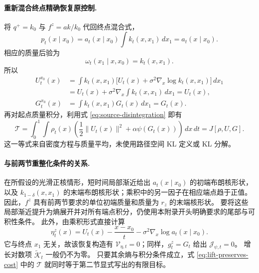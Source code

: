 \documentclass[UTF8,a4paper,11pt,fontset=fandol]{ctexart}
\begin{document}
\paragraph{重新混合终点精确恢复原控制.}
将 $q^+=k_0$ 与 $f^z=ak/k_0$ 代回终点混合式，
\begin{equation}
p_t(x\mid x_0)
=a_t(x\mid x_0)\int k_t(x,x_1)\,dx_1
=a_t(x\mid x_0).
\end{equation}
相应的质量后验为
\begin{equation}
\omega_t(x_1\mid x,x_0)=k_t(x,x_1).
\end{equation}
所以
\begin{equation}
\begin{aligned}
U_t^{x_0}(x)
&=\int k_t(x,x_1)
\bigl[U_t(x)+\sigma^2\nabla_x\log k_t(x,x_1)\bigr]\,dx_1\\
&=U_t(x)+\sigma^2\nabla_x\int k_t(x,x_1)\,dx_1
=U_t(x),\\
G_t^{x_0}(x)&=\int k_t(x,x_1)G_t(x)\,dx_1=G_t(x).
\end{aligned}
\label{eq:exact-feedback-recovery-proof}
\end{equation}
再对起点质量积分，利用式 \eqref{eq:source-disintegration} 即有
\begin{equation}
\mathcal T
=\int_0^1\int\rho_t(x)
\left(\frac12\|U_t(x)\|^2+\alpha\psi(G_t(x))\right)\,dx\,dt
=J[\rho,U,G].
\label{eq:lift-preserves-cost}
\end{equation}
这一等式来自密度方程与质量平均，未使用路径空间 KL 定义或 KL 分解。

\paragraph{与前两节重整化条件的关系.}
在所假设的光滑正核情形，短时间局部渐近给出
$a_t(x\mid x_0)$ 的初端布朗核形状，以及 $k_{1-\delta}(x,x_1)$
的末端布朗核形状；乘积中的另一因子在相应端点趋于正值。
因此，$f^z$ 具有前两节要求的单位初端质量和质量为 $r_z$ 的末端核形状。
要将这些局部渐近提升为熵展开并对所有端点积分，仍使用本附录开头明确要求的尾部与可积性条件。
此外，由乘积形式直接计算
\begin{equation}
\eta_t^z(x)
=U_t(x)-\frac{x-x_0}{t}
-\sigma^2\nabla_x\log a_t(x\mid x_0).
\end{equation}
它与终点 $x_1$ 无关，故该恢复构造有
$\mathcal V_{\eta,t}=0$；同样，$g_t^z=G_t$ 给出 $\mathcal J_{\psi,t}=0$。
增长对数项 $\widetilde{\mathcal K}_t$ 一般仍不为零。
只要其余熵与积分条件成立，式 \eqref{eq:lift-preserves-cost}
中的 $\mathcal T$ 就同时等于第二节显式写出的有限目标。
\end{document}
